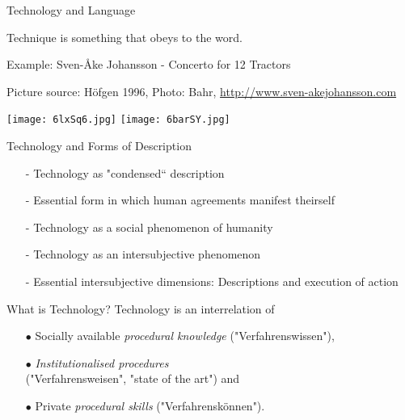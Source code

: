 \documentclass{beamer}
\begin{document}
\begin{frame}{Technology and Language}

Technique is something that obeys to the word.

Example: Sven-Åke Johansson - Concerto for 12 Tractors

Picture source: Höfgen 1996, Photo: Bahr,
\url{http://www.sven-akejohansson.com}

\begin{center}
  \texttt{[image: 6lxSq6.jpg]}\hfill
  \texttt{[image: 6barSY.jpg]}
\end{center}

\end{frame}

\begin{frame}{Technology and Forms of Description}
  \begin{itemize}
  \item[-] Technology as "condensed“ description
  \item[-] Essential form in which human agreements manifest theirself
  \item[-] Technology as a social phenomenon of humanity
  \item[-] Technology as an intersubjective phenomenon
  \item[-] Essential intersubjective dimensions: Descriptions and execution of
    action
  \end{itemize}
  \begin{block}{What is Technology?} 
    Technology is an interrelation of
    \begin{itemize}
    \item[$\bullet$] Socially available \emph{procedural knowledge}
      ("Verfahrenswissen"), 
    \item[$\bullet$] \emph{Institutionalised
      procedures}\\ ("Verfahrensweisen", "state of the art") and
    \item[$\bullet$] Private \emph{procedural skills} ("Verfahrenskönnen").
    \end{itemize}
  \end{block}
\end{frame}
\end{document}
